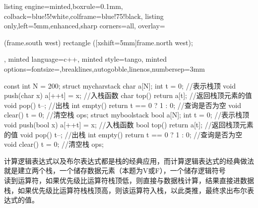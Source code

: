 \documentclass[12pt]{article}
\begin{document}
\begin{tcblisting}{listing engine=minted,boxrule=0.1mm,
colback=blue!5!white,colframe=blue!75!black,
listing only,left=5mm,enhanced,sharp corners=all,
overlay={\begin{tcbclipinterior} (frame.south west)
rectangle ([xshift=5mm]frame.north west);\end{tcbclipinterior}},
minted language=c++,
minted style=tango,
minted options={fontsize=\small,breaklines,autogobble,linenos,numbersep=3mm}}
const int N = 200;
struct mycharstack {
    char a[N];
    int t = 0;  //表示栈顶
    void push(char x) { a[++t] = x; }  //入栈函数
    char top() { return a[t]; }  //返回栈顶元素的值
    void pop() { t--; }   //出栈
    int empty() { return t == 0 ? 1 : 0; }  //查询是否为空
    void clear() { t = 0; }   //清空栈
} ops;
struct myboolstack {
    bool a[N];
    int t = 0;  //表示栈顶
    void push(bool x) { a[++t] = x; }  //入栈函数
    bool top() { return a[t]; }  //返回栈顶元素的值
    void pop() { t--; }   //出栈
    int empty() { return t == 0 ? 1 : 0; }  //查询是否为空
    void clear() { t = 0; }   //清空栈
} ops;
\end{tcblisting}
{\songti 计算逻辑表达式以及布尔表达式都是栈的经典应用，而计算逻辑表达式的经典做法就是建立两个栈，一个储存数据元素（本题为V或F），一个储存逻辑符号\\
读到运算符，如果优先级比运算符栈顶低，则直接与数据栈计算，结果直接进数据栈，如果优先级比运算符栈栈顶高，则该运算符入栈，以此类推，最终求出布尔表达式的值。}
\end{document}
